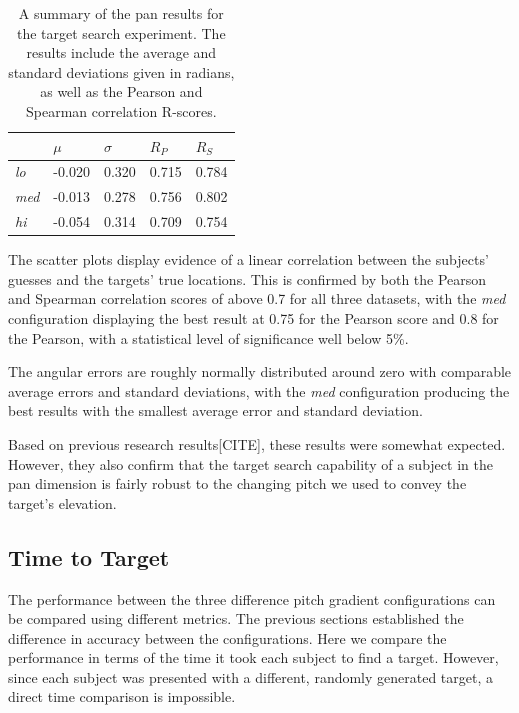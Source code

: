 \documentclass[format=sigconf, review=true, screen=true, anonymous=true]{acmart}
\begin{document}
\begin{table}
  \centering
  \caption{A summary of the pan results for the target search experiment. The results include the average and standard deviations given in radians, as well as the Pearson and Spearman correlation R-scores.}
  \label{tab:pan-results}
  \begin{tabular}{|l|l|l|l|l|}
    \hline
    & $\mu$ & $\sigma$ & $R_{P}$ & $R_{S}$ \\\hline\hline
    \emph{lo}  & -0.020 & 0.320 & 0.715 & 0.784 \\\hline
    \emph{med} & -0.013 & 0.278 & 0.756 & 0.802 \\\hline
    \emph{hi}  & -0.054 & 0.314 & 0.709 & 0.754 \\\hline
  \end{tabular}
\end{table}

The scatter plots display evidence of a linear correlation between the subjects' guesses and the targets' true locations. This is confirmed by both the Pearson and Spearman correlation scores of above 0.7 for all three datasets, with the \emph{med} configuration displaying the best result at 0.75 for the Pearson score and 0.8 for the Pearson, with a statistical level of significance well below 5\%. 

The angular errors are roughly normally distributed around zero with comparable average errors and standard deviations, with the \emph{med} configuration producing the best results with the smallest average error and standard deviation. 

Based on previous research results[CITE], these results were somewhat expected. However, they also confirm that the target search capability of a subject in the pan dimension is fairly robust to the changing pitch we used to convey the target's elevation. %

\subsection{Time to Target}

The performance between the three difference pitch gradient configurations can be compared using different metrics. The previous sections established the difference in accuracy between the configurations. Here we compare the performance in terms of the time it took each subject to find a target. However, since each subject was presented with a different, randomly generated target, a direct time comparison is impossible. 
\end{document}
